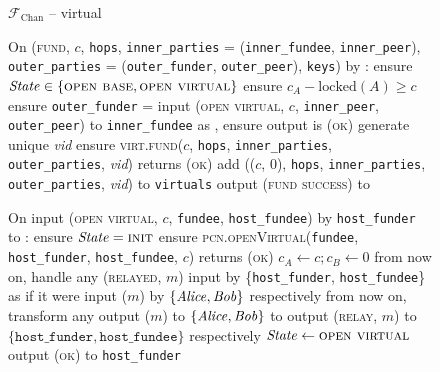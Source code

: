 \begin{figure}[H]
  \begin{systembox}{$\mathcal{F}_{\mathrm{Chan}}$ -- virtual}
    \begin{algorithmic}[1]
      \State On (\textsc{fund}, $c$, \texttt{hops}, \texttt{inner\_parties} =
      (\texttt{inner\_fundee}, \texttt{inner\_peer}), \texttt{outer\_parties} =
      (\texttt{outer\_funder}, \texttt{outer\_peer}), \texttt{keys}) by \alice:
      \label{code:functionality:chan:skeleton:virtual:fund}
      \Indent
        \State ensure $\mathit{State} \in \{\textsc{open base}, \textsc{open
        virtual}\}$
        \label{code:functionality:chan:skeleton:virtual:fund:start}
        \State ensure $c_A - \mathrm{locked}(A) \geq c$
        \State ensure \texttt{outer\_funder} = \alice
        \label{code:functionality:chan:skeleton:virtual:fund:id}
        \State input (\textsc{open virtual}, $c$, \texttt{inner\_peer},
        \texttt{outer\_peer}) to \texttt{inner\_fundee} as \alice, ensure output
        is (\textsc{ok})
        \label{code:functionality:chan:skeleton:virtual:subfunc}
        \State generate unique \textit{vid}
        \label{code:functionality:chan:skeleton:virtual:id}
        \State ensure \textsc{virt.fund}($c$, \texttt{hops},
        \texttt{inner\_parties}, \texttt{outer\_parties}, \textit{vid}) returns
        (\textsc{ok})
        \label{code:functionality:chan:skeleton:virtual:fund:virt}
        \State add (($c$, 0), \texttt{hops}, \texttt{inner\_parties},
        \texttt{outer\_parties}, \textit{vid}) to \texttt{virtuals}
        \label{code:functionality:chan:skeleton:virtual:fund:store}
        \State output (\textsc{fund success}) to \alice
        \label{code:functionality:chan:skeleton:virtual:fund:end}
      \EndIndent
      \Statex

      \State On input (\textsc{open virtual}, $c$, \texttt{fundee},
      \texttt{host\_fundee}) by \texttt{host\_funder} to \alice:
      \label{code:functionality:chan:skeleton:virtual:open-virtual}
      \Indent
        \State ensure $\mathit{State} = \textsc{init}$
        \State ensure \textsc{pcn.openVirtual}(\texttt{fundee},
        \texttt{host\_funder}, \texttt{host\_fundee}, $c$) returns (\textsc{ok})
        \label{code:functionality:chan:skeleton:virtual:ln}
        \State $c_A \gets c; c_B \gets 0$
        \State from now on, handle any (\textsc{relayed}, $m$) input by
        \{\texttt{host\_funder}, \texttt{host\_fundee}\} as if it were input
        ($m$) by $\{\mathit{Alice}, \mathit{Bob}\}$ respectively
        \State from now on, transform any output ($m$) to $\{\mathit{Alice}, \mathit{Bob}\}$ to
        output (\textsc{relay}, $m$) to $\{\texttt{host\_funder},
        \texttt{host\_fundee}\}$ respectively
        \State $\mathit{State} \gets \textsc{open virtual}$
        \State output (\textsc{ok}) to \texttt{host\_funder}
      \EndIndent
      \Statex


\end{algorithmic}
\end{systembox}
\end{figure}
